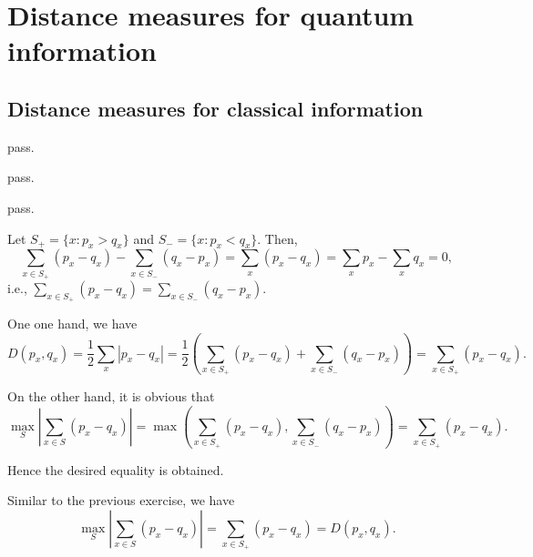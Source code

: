 \chapter{Distance measures for quantum information}

\section{Distance measures for classical information}

\ex pass.

\ex pass.

\ex pass.

\ex Let $S_+ =\{x:p_x>q_x\}$ and $S_- =\{x:p_x<q_x\}$.
Then,
$$\sum_{x\in S_+}(p_x-q_x)-\sum_{x\in S_-}(q_x-p_x)=\sum_x(p_x-q_x)=\sum_xp_x-\sum_xq_x=0,$$
i.e., $\sum_{x\in S_+}(p_x-q_x)=\sum_{x\in S_-}(q_x-p_x)$.

One one hand, we have
$$D(p_x,q_x) = \frac{1}{2}\sum_x|p_x-q_x| = \frac{1}{2}\left(\sum_{x\in S_+}(p_x-q_x)+\sum_{x\in S_-}(q_x-p_x)\right) = \sum_{x\in S_+}(p_x-q_x).$$

On the other hand, it is obvious that
$$\max_S\left|\sum_{x\in S}(p_x-q_x)\right| = \max\left(\sum_{x\in S_+}(p_x-q_x), \sum_{x\in S_-}(q_x-p_x)\right) = \sum_{x\in S_+}(p_x-q_x).$$

Hence the desired equality is obtained.

\ex Similar to the previous exercise, we have
$$\max_S\left|\sum_{x\in S}(p_x-q_x)\right| = \sum_{x\in S_+}(p_x-q_x) = D(p_x, q_x).$$

